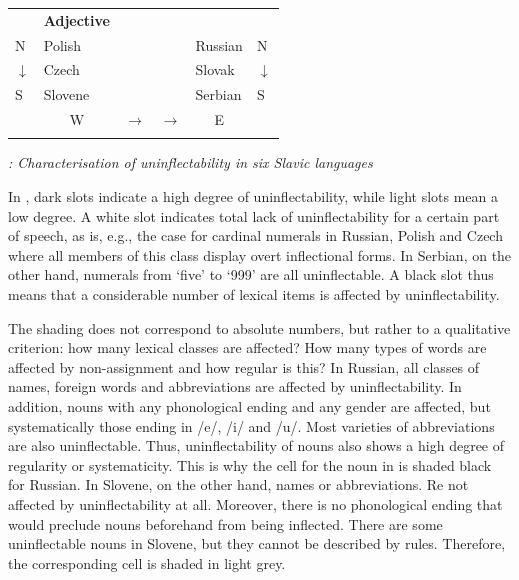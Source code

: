 \documentclass[output=paper]{langscibook}
\begin{document}
\begin{tabularx}{\textwidth}{XXXXXX}

\lsptoprule
\multicolumn{1}{c}{} & \multicolumn{1}{c}{\textbf{Adjective}} & \multicolumn{1}{c}{} & \multicolumn{1}{c}{} & \multicolumn{1}{c}{} & \\
N & Polish &  &  & Russian & N\\
${\downarrow}$ & Czech &  &  & Slovak & ${\downarrow}$\\
S & Slovene &  &  & Serbian & S\\
\multicolumn{1}{c}{} & \multicolumn{1}{c}{W} & \multicolumn{1}{c}{${\rightarrow}$} & \multicolumn{1}{c}{\raggedleft ${\rightarrow}$} & \multicolumn{1}{c}{\raggedleft E} & \\
\lspbottomrule
\end{tabularx}
\begin{stylelsTableHeading}
\textmd{\textit{: Characterisation of uninflectability in six Slavic languages}}
\end{stylelsTableHeading}

In , dark slots indicate a high degree of uninflectability, while light slots mean a low degree. A white slot indicates total lack of uninflectability for a certain part of speech, as is, e.g., the case for cardinal numerals in Russian, Polish and Czech where all members of this class display overt inflectional forms. In Serbian, on the other hand, numerals from ‘five’ to ‘999’ are all uninflectable. A black slot thus means that a considerable number of lexical items is affected by uninflectability. 

The shading does not correspond to absolute numbers, but rather to a qualitative criterion: how many lexical classes are affected? How many types of words are affected by non-assignment and how regular is this? In Russian, all classes of names, foreign words and abbreviations are affected by uninflectability. In addition, nouns with any phonological ending and any gender are affected, but systematically those ending in /e/, /i/ and /u/. Most varieties of abbreviations are also uninflectable. Thus, uninflectability of nouns also shows a high degree of regularity or systematicity. This is why the cell for the noun in  is shaded black for Russian. In Slovene, on the other hand, names or abbreviations. Re not affected by uninflectability at all. Moreover, there is no phonological ending that would preclude nouns beforehand from being inflected. There are some uninflectable nouns in Slovene, but they cannot be described by rules. Therefore, the corresponding cell is shaded in light grey.
\end{document}
